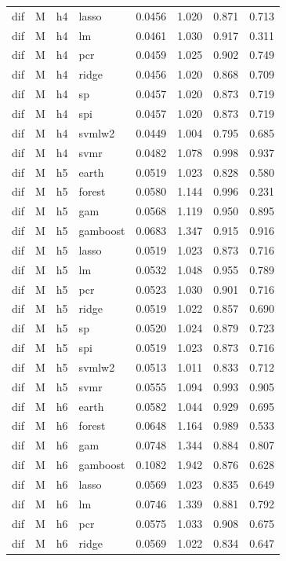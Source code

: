 \begin{ThreePartTable}
\begin{longtable}[t]{llclcccc}
dif & M & h4 & lasso & 0.0456 & 1.020 & 0.871 & 0.713\\
dif & M & h4 & lm & 0.0461 & 1.030 & 0.917 & 0.311\\
dif & M & h4 & pcr & 0.0459 & 1.025 & 0.902 & 0.749\\
dif & M & h4 & ridge & 0.0456 & 1.020 & 0.868 & 0.709\\
dif & M & h4 & sp & 0.0457 & 1.020 & 0.873 & 0.719\\
dif & M & h4 & spi & 0.0457 & 1.020 & 0.873 & 0.719\\
dif & M & h4 & svmlw2 & 0.0449 & 1.004 & 0.795 & 0.685\\
dif & M & h4 & svmr & 0.0482 & 1.078 & 0.998 & 0.937\\
\addlinespace
dif & M & h5 & earth & 0.0519 & 1.023 & 0.828 & 0.580\\
dif & M & h5 & forest & 0.0580 & 1.144 & 0.996 & 0.231\\
dif & M & h5 & gam & 0.0568 & 1.119 & 0.950 & 0.895\\
dif & M & h5 & gamboost & 0.0683 & 1.347 & 0.915 & 0.916\\
dif & M & h5 & lasso & 0.0519 & 1.023 & 0.873 & 0.716\\
dif & M & h5 & lm & 0.0532 & 1.048 & 0.955 & 0.789\\
dif & M & h5 & pcr & 0.0523 & 1.030 & 0.901 & 0.716\\
dif & M & h5 & ridge & 0.0519 & 1.022 & 0.857 & 0.690\\
dif & M & h5 & sp & 0.0520 & 1.024 & 0.879 & 0.723\\
dif & M & h5 & spi & 0.0519 & 1.023 & 0.873 & 0.716\\
dif & M & h5 & svmlw2 & 0.0513 & 1.011 & 0.833 & 0.712\\
dif & M & h5 & svmr & 0.0555 & 1.094 & 0.993 & 0.905\\
\addlinespace
dif & M & h6 & earth & 0.0582 & 1.044 & 0.929 & 0.695\\
dif & M & h6 & forest & 0.0648 & 1.164 & 0.989 & 0.533\\
dif & M & h6 & gam & 0.0748 & 1.344 & 0.884 & 0.807\\
dif & M & h6 & gamboost & 0.1082 & 1.942 & 0.876 & 0.628\\
dif & M & h6 & lasso & 0.0569 & 1.023 & 0.835 & 0.649\\
dif & M & h6 & lm & 0.0746 & 1.339 & 0.881 & 0.792\\
dif & M & h6 & pcr & 0.0575 & 1.033 & 0.908 & 0.675\\
dif & M & h6 & ridge & 0.0569 & 1.022 & 0.834 & 0.647\\

\end{longtable}
\end{ThreePartTable}
